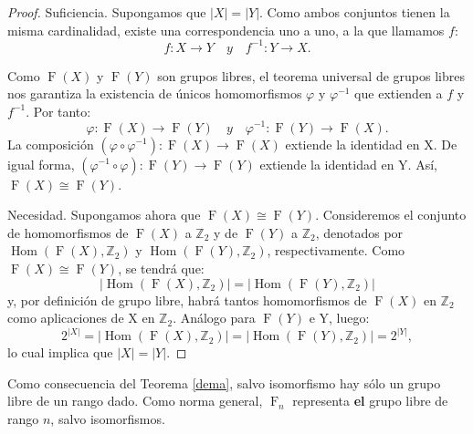 \begin{proof}
\mbox{}\par 
Suficiencia. Supongamos que $|X|=|Y|$. Como ambos conjuntos tienen la misma cardinalidad, existe una correspondencia uno a uno, a la que llamamos $f$:
\[
    f \colon X \rightarrow Y \quad y \quad f^{-1} \colon Y \rightarrow X .
\]

Como $\operatorname{F}(X)$ y $\operatorname{F}(Y)$ son grupos libres, el teorema universal de grupos libres nos garantiza la existencia de únicos homomorfismos $\varphi$ y $\varphi^{-1}$ que extienden a $f$ y $f^{-1}$.
Por tanto:
\[
    \varphi \colon \operatorname{F}(X) \rightarrow \operatorname{F}(Y) \quad y \quad \varphi^{-1} \colon \operatorname{F}(Y) \rightarrow \operatorname{F}(X) .
\]
La composición $(\varphi \circ \varphi^{-1}) \colon \operatorname{F}(X) \rightarrow \operatorname{F}(X)$ extiende la identidad en X. De igual forma, $(\varphi^{-1} \circ \varphi)\colon \operatorname{F}(Y) \rightarrow \operatorname{F}(Y)$ extiende la identidad en Y. Así, $\operatorname{F}(X)\cong \operatorname{F}(Y)$.



Necesidad. Supongamos ahora que $\operatorname{F}(X) \cong \operatorname{F}(Y)$. Consideremos el conjunto de homomorfismos de $\operatorname{F}(X)$ a $\mathbb{Z}_2$ y de $\operatorname{F}(Y)$ a $\mathbb{Z}_2$, denotados por $\operatorname{Hom}(\operatorname{F}(X),\mathbb{Z}_2)$ y $\operatorname{Hom}(\operatorname{F}(Y),\mathbb{Z}_2)$, respectivamente. Como $\operatorname{F}(X) \cong \operatorname{F}(Y)$, se tendrá que:
\[
|\operatorname{Hom}(\operatorname{F}(X),\mathbb{Z}_2)| = |\operatorname{Hom}(\operatorname{F}(Y),\mathbb{Z}_2)|
\]
y, por definición de grupo libre, habrá tantos homomorfismos de $\operatorname{F}(X)$ en $\mathbb{Z}_2$ como aplicaciones de X en $\mathbb{Z}_2$. Análogo para $\operatorname{F}(Y)$ e Y, luego:
\[
    2^{|X|} = |\operatorname{Hom}(\operatorname{F}(X),\mathbb{Z}_2)| = |\operatorname{Hom}(\operatorname{F}(Y),\mathbb{Z}_2)| =  2^{|Y|} ,
\]
lo cual implica que $ |X|=|Y|$.
\end{proof}



Como consecuencia del Teorema \ref{dema}, salvo isomorfismo hay sólo un grupo libre de un rango dado. Como norma general, $\operatorname{F}_n$ representa \textbf{el} grupo libre de rango $n$, salvo isomorfismos.





